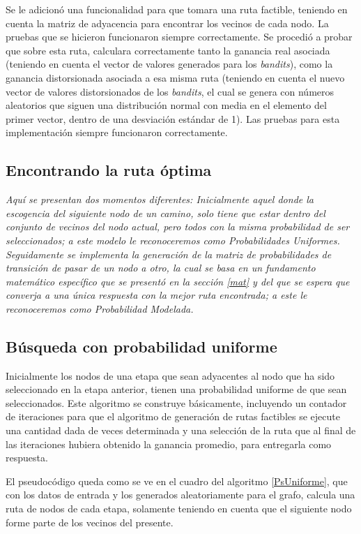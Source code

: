 Se le adicionó una funcionalidad para que tomara una ruta factible, teniendo en cuenta la matriz de adyacencia para encontrar los vecinos de cada nodo. La pruebas que se hicieron funcionaron siempre correctamente. Se procedió a probar que sobre esta ruta, calculara correctamente tanto la ganancia real asociada (teniendo en cuenta el vector de valores generados para los \textit{bandits}), como la ganancia distorsionada asociada a esa misma ruta (teniendo en cuenta el nuevo vector de valores distorsionados de los \textit{bandits}, el cual se genera con números aleatorios que siguen una distribución normal con media en el elemento del primer vector, dentro de una desviación estándar de 1). Las pruebas para esta implementación siempre funcionaron correctamente.

\subsection{Encontrando la ruta óptima}

\textit{Aquí se presentan dos momentos diferentes: Inicialmente aquel donde la escogencia del siguiente nodo de un camino, solo tiene que estar dentro del conjunto de vecinos del nodo actual, pero todos con la misma probabilidad de ser seleccionados; a este modelo le reconoceremos como Probabilidades Uniformes. Seguidamente se implementa la generación de la matriz de probabilidades de transición de pasar de un nodo a otro, la cual se basa en un fundamento matemático específico que se presentó en la sección \ref{mat} y del que se espera que converja a una única respuesta con la mejor ruta encontrada; a este le reconoceremos como Probabilidad Modelada.}

\subsection{Búsqueda con probabilidad uniforme}

Inicialmente los nodos de una etapa que sean adyacentes al nodo que ha sido seleccionado en la etapa anterior, tienen una probabilidad uniforme de que sean seleccionados. Este algoritmo se construye básicamente, incluyendo un contador de iteraciones para que el algoritmo de generación de rutas factibles se ejecute una cantidad dada de veces determinada y una selección de la ruta que al final de las iteraciones hubiera obtenido la ganancia promedio, para entregarla como respuesta. 

El pseudocódigo queda como se ve en el cuadro del algoritmo \ref{PsUniforme}, que con los datos de entrada y los generados aleatoriamente para el grafo, calcula una ruta de nodos de cada etapa, solamente teniendo en cuenta que el siguiente nodo forme parte de los vecinos del presente.

